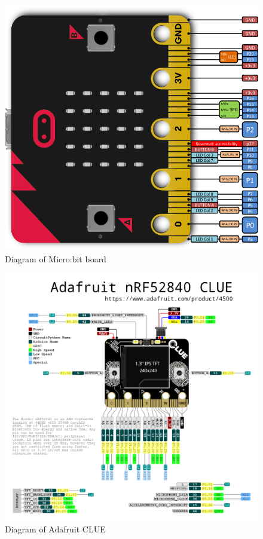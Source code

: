 \begin{figure}[H]
    \includegraphics[scale=0.4]{Report/Images/MicrobitBoard.png}
    \caption{Diagram of Micro:bit board \cite{microbitDoc}}
    \label{fig:MicrobitBoard}
\end{figure}

\begin{figure}[H]
    \centering
    \includegraphics[scale=0.2]{Report/Images/ClueBoardDiagram.png}
    \caption{Diagram of Adafruit CLUE \cite{learnAdafruit}}
    \label{fig:CLUEDiagram}
\end{figure}

